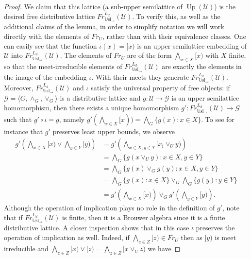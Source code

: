 \documentclass[11pt]{amsart}
\DeclareMathOperator{\up}{Up}
\newcommand{\Usl}{\mathbb{U}\textrm{sl}}
\begin{document}
\begin{proof}
We claim that this lattice (a sub-upper semilattice of $\up(\mathscr{U})$) is 
the desired free distributive lattice  $Fr^{L_d}_ 
{\Usl_{\rightarrow}}(\mathscr{U})$. To verify this, as well as the additional 
claims of the lemma, in order to simplify notation we will work directly with 
the elements of $Fr_U$, rather than with their equivalence classes. One can 
easily see that the function $\iota(x)=[x)$ is an upper semilattice embedding 
of $\mathscr{U}$ into $Fr^{L_d}_{\Usl_{\rightarrow}} (\mathscr{U})$. The 
elements of $Fr_U$ are of the form $\bigwedge_{x \in X} [x)$ with $X$ 
finite, so that the meet-irreducible elements of $Fr^{L_d}_ 
{\Usl_{\rightarrow}}(\mathscr{U})$ are exactly the elements in the image of 
the embedding $\iota$. With their meets they generate 
$Fr^{L_d}_{\Usl_{\rightarrow}} (\mathscr{U})$. Moreover, $Fr^{L_d}_ 
{\Usl_{\rightarrow}}(\mathscr{U})$ and $\iota$ satisfy the universal property 
of free objects: if $\mathcal{G}=\langle G, \wedge_G, \lor_G \rangle$ is a 
distributive lattice and $g: \mathscr{U} \rightarrow \mathcal{G}$ is an upper 
semilattice homomorphism, then there exists a unique homomorphism $g': 
Fr^{L_d}_ {\Usl_{\rightarrow}}(\mathscr{U}) \rightarrow \mathcal{G}$ such 
that $g' \circ \iota=g$, namely $g'(\bigwedge_{x \in X} [x))=\bigwedge_G 
\{g(x): x \in X\}$. To see for instance that $g'$ preserves least upper 
bounds, we observe 
\begin{align*}
g'\left(\bigwedge_{x \in X} [x) \lor \bigwedge_{y \in Y} [y)\right)
&=g'\left(\bigwedge_{x \in X, y \in Y} [x_i \lor_U y)\right)\\
& = \bigwedge_G \{g(x \lor_U y): x \in X, y \in Y\}\\
& = \bigwedge_G \{g(x) \lor_G g(y): x \in X, y \in Y\}\\
& = \bigwedge_G \{g(x): x \in X\} \lor_G \bigwedge_G \{g(y): y \in Y\}\\
& = g'\left(\bigwedge_{x \in X} [x)\right) \lor_G g'\left(\bigwedge_{y \in Y} [y)\right).
\end{align*}
Although the operation of implication plays no role in the definition of 
$g'$, note that if $Fr^{L_d}_ {\Usl_{\rightarrow}}(\mathscr{U})$ is finite, 
then it is a Brouwer algebra since it is a finite distributive lattice. A 
closer inspection shows that in this case $\iota$ preserves the operation of 
implication as well. Indeed, if $\bigwedge_{z \in Z} [z) \in Fr_U$ then as $[y)$ is meet irreducible and $\bigwedge_{z \in Z}[x) \lor  [z)=\bigwedge_{z \in Z}[x \lor_U z)$ we have

\end{proof}
\end{document}
